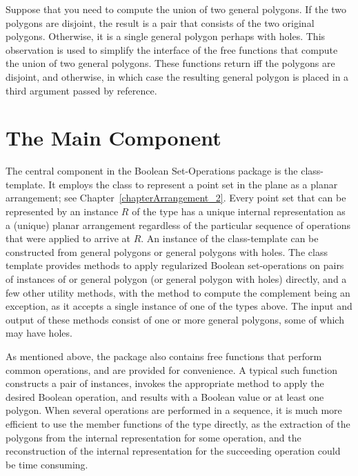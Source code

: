 Suppose that you need to compute the union of two general polygons. If the
two polygons are disjoint, the result is a pair that consists of the two 
original polygons. Otherwise, it is a single general polygon perhaps with 
holes. This observation is used to simplify the interface of the free
functions that compute the union of two general polygons. These functions
return  iff the polygons are disjoint, and  otherwise,
in which case the resulting general polygon is placed in a third argument 
passed by reference.


\section{The Main Component}
\label{bobs_sec:main_component}
The central component in the Boolean Set-Operations package is the
 class-template. It employs the
 class to represent a point set in the plane as a
planar arrangement; see Chapter~\ref{chapterArrangement_2}. 
Every point set that can be represented by an instance $R$ of the 
 type has a unique internal representation 
as a (unique) planar arrangement regardless of the particular sequence 
of operations that were applied to arrive at $R$. 
An instance of the  class-template can be
constructed from general polygons or general polygons with holes.
The class template provides methods to apply regularized Boolean 
set-operations on pairs of instances of  
or general polygon (or general polygon with holes) directly, and a few
other utility methods, with the method to compute the complement being 
an exception, as it accepts a single instance of one of the types above. 
The input and output of these methods consist of one or more general 
polygons, some of which may have holes.

As mentioned above, the package also contains free functions that perform 
common operations, and are provided for convenience. A typical such function 
constructs a pair of  instances, invokes the 
appropriate method to apply the desired Boolean operation, and results with 
a Boolean value or at least one polygon. When several operations are 
performed in a sequence, it is much more efficient to use the member 
functions of the  type directly, as the 
extraction of the polygons from the internal representation for some 
operation, and the reconstruction of the internal representation for 
the succeeding operation could be time consuming.


